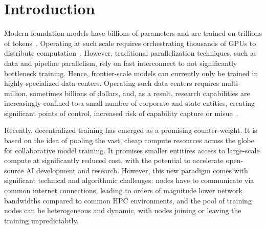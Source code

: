 \documentclass{article}
\begin{document}

\begin{abstract}
  ...
\end{abstract}

\section{Introduction}

Modern foundation models have billions of parameters and are trained on
trillions of tokens~\cite{kaplan2020,hoffmann2022,brown2023}. Operating at such
scale requires orchestrating thousands of GPUs to distribute
computation~\cite{dubey2024,deepseekai2024}. However, traditional
parallelization techniques, such as data and pipeline parallelism, rely on fast
interconnect to not significantly bottleneck training. Hence, frontier-scale
models can currently only be trained in highly-specialized data centers.
Operating such data centers requires multi-million, sometimes billions of
dollars, and, as a result, research capabilities are increasingly confined to a
small number of corporate and state entities, creating significant points of
control, increased risk of capability capture or misue~\cite{intellect1}.


Recently, decentralized training has emerged as a promising counter-weight. It
is based on the idea of pooling the vast, cheap compute resources across the
globe for collaborative model training. It promises smaller entitires access to
large-scale compute at significantly reduced cost, with the potential to
accelerate open-source AI development and research. However, this new paradigm
comes with significant technical and algorithmic challenges: nodes have to
communicate via common internet connections, leading to orders of magnitude
lower network bandwidths compared to common HPC environments, and the pool of
training nodes can be heterogeneous and dynamic, with nodes joining or leaving
the training unpredictabtly. 
\end{document}
